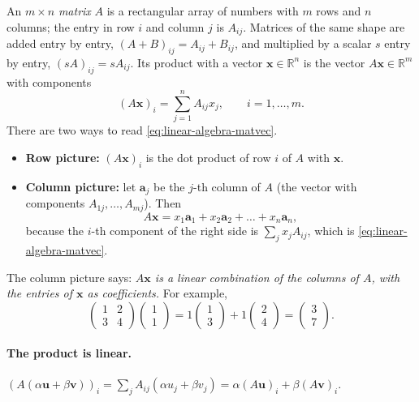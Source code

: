 An $m\times n$ \emph{matrix} $A$ is a rectangular array of numbers with $m$ rows and $n$ columns; the entry in row $i$ and column $j$ is $A_{ij}$. Matrices of the same shape are added entry by entry, $(A+B)_{ij}=A_{ij}+B_{ij}$, and multiplied by a scalar $s$ entry by entry, $(sA)_{ij}=sA_{ij}$. Its product with a vector $\bm x\in\mathbb R^n$ is the vector $A\bm x\in\mathbb R^m$ with components
\begin{equation}
(A\bm x)_i=\sum_{j=1}^nA_{ij}x_j,\qquad i=1,\dots,m.
\label{eq:linear-algebra-matvec}
\end{equation}
There are two ways to read \cref{eq:linear-algebra-matvec}.
\begin{itemize}
\item \textbf{Row picture:} $(A\bm x)_i$ is the dot product of row $i$ of $A$ with $\bm x$.
\item \textbf{Column picture:} let $\bm a_j$ be the $j$-th column of $A$ (the vector with components $A_{1j},\dots,A_{mj}$). Then
\begin{equation}
A\bm x=x_1\bm a_1+x_2\bm a_2+\dots+x_n\bm a_n ,
\label{eq:linear-algebra-colpic}
\end{equation}
because the $i$-th component of the right side is $\sum_jx_jA_{ij}$, which is \cref{eq:linear-algebra-matvec}.
\end{itemize}
The column picture says: \emph{$A\bm x$ is a linear combination of the columns of $A$, with the entries of $\bm x$ as coefficients.} For example,
\[
\begin{pmatrix}1&2\\3&4\end{pmatrix}\begin{pmatrix}1\\1\end{pmatrix}=1\begin{pmatrix}1\\3\end{pmatrix}+1\begin{pmatrix}2\\4\end{pmatrix}=\begin{pmatrix}3\\7\end{pmatrix}.
\]

\paragraph{The product is linear.} $(A(\alpha\bm u+\beta\bm v))_i=\sum_jA_{ij}(\alpha u_j+\beta v_j)=\alpha(A\bm u)_i+\beta(A\bm v)_i$.

